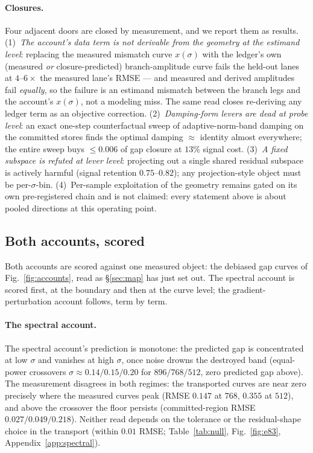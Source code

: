 \paragraph{Closures.}
Four adjacent doors are closed by measurement, and we report them as
results. (1)~\emph{The account's data term is not derivable from the
geometry at the estimand level}: replacing the measured mismatch
curve $x(\sigma)$ with the ledger's own (measured \emph{or}
closure-predicted) branch-amplitude curve fails the held-out lanes at
$4$--$6\times$ the measured lane's RMSE --- and measured and derived
amplitudes fail \emph{equally}, so the failure is an estimand
mismatch between the branch legs and the account's $x(\sigma)$, not
a modeling miss. The same read closes re-deriving any ledger term as
an objective correction. (2)~\emph{Damping-form levers are dead at
probe level}: an exact one-step counterfactual sweep of
adaptive-norm-band damping on the committed stores finds the optimal
damping $\approx$ identity almost everywhere; the entire sweep buys
$\le 0.006$ of gap closure at $13\%$ signal cost. (3)~\emph{A fixed
subspace is refuted at lever level}: projecting out a single shared
residual subspace is actively harmful (signal retention
$0.75$--$0.82$); any projection-style object must be per-$\sigma$-bin.
(4)~Per-sample exploitation of the geometry remains gated on its own
pre-registered chain and is not claimed: every statement above is
about pooled directions at this operating point.

\subsection{Both accounts, scored}
\label{sec:scored}
\label{sec:specscored}
\label{sec:ourscored}

Both accounts are scored against one measured object: the debiased
gap curves of Fig.~\ref{fig:accounts}, read as \S\ref{sec:map} has
just set out. The spectral account is scored first, at the boundary
and then at the curve level; the gradient-perturbation account
follows, term by term.

\paragraph{The spectral account.}
The spectral account's prediction is monotone: the predicted gap is
concentrated at low $\sigma$ and vanishes at high $\sigma$, once
noise drowns the destroyed band (equal-power crossovers
$\sigma \approx 0.14/0.15/0.20$ for $896/768/512$, zero predicted gap
above). The measurement disagrees in both regimes: the transported
curves are near zero precisely where the measured curves peak (RMSE
$0.147$ at $768$, $0.355$ at $512$), and above the crossover the
floor persists (committed-region RMSE $0.027/0.049/0.218$). Neither
read depends on the tolerance or the residual-shape choice in the
transport (within $0.01$ RMSE; Table~\ref{tab:null},
Fig.~\ref{fig:e83}, Appendix~\ref{app:spectral}).



